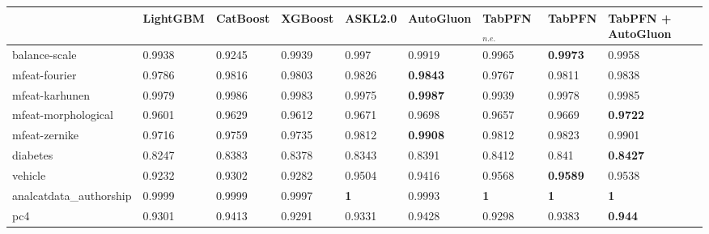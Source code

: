 \begin{tabular}{@{\hskip 0mm}
l@{\hskip 1mm}
l@{\hskip 1mm}
l@{\hskip 1mm}
l@{\hskip 1mm}
l@{\hskip 1mm}
l@{\hskip 1mm}
l@{\hskip 1mm}
l@{\hskip 1mm}
l@{\hskip 0mm}}
\toprule
{} &        LightGBM &        CatBoost &         XGBoost &          ASKL2.0 &        AutoGluon &  TabPFN$_{n.e.}$ &                    TabPFN &        TabPFN + AutoGluon \\
\midrule
balance-scale                    &          0.9938 &          0.9245 &          0.9939 &            0.997 &           0.9919 &           0.9965 &           \textbf{0.9973} &                    0.9958 \\
mfeat-fourier                    &          0.9786 &          0.9816 &          0.9803 &           0.9826 &  \textbf{0.9843} &           0.9767 &                    0.9811 &                    0.9838 \\
mfeat-karhunen                   &          0.9979 &          0.9986 &          0.9983 &           0.9975 &  \textbf{0.9987} &           0.9939 &                    0.9978 &                    0.9985 \\
mfeat-morphological              &          0.9601 &          0.9629 &          0.9612 &           0.9671 &           0.9698 &           0.9657 &                    0.9669 &           \textbf{0.9722} \\
mfeat-zernike                    &          0.9716 &          0.9759 &          0.9735 &           0.9812 &  \textbf{0.9908} &           0.9812 &                    0.9823 &                    0.9901 \\
diabetes                         &          0.8247 &          0.8383 &          0.8378 &           0.8343 &           0.8391 &           0.8412 &                     0.841 &           \textbf{0.8427} \\
vehicle                          &          0.9232 &          0.9302 &          0.9282 &           0.9504 &           0.9416 &           0.9568 &           \textbf{0.9589} &                    0.9538 \\
analcatdata_authorship           &          0.9999 &          0.9999 &          0.9997 &       \textbf{1} &           0.9993 &       \textbf{1} &                \textbf{1} &                \textbf{1} \\
pc4                              &          0.9301 &          0.9413 &          0.9291 &           0.9331 &           0.9428 &           0.9298 &                    0.9383 &            \textbf{0.944} \\

\end{tabular}
